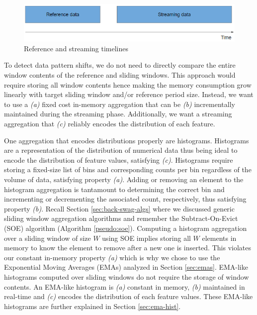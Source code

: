\begin{figure}[!htb]
    \begin{center}
      \includegraphics[scale=0.7]{figures/timeperiods.png}
      \caption[]{Reference and streaming timelines}
      \label{fig:timelines}
    \end{center}
\end{figure}

To detect data pattern shifts, we do not need to directly compare the entire window contents of the reference and sliding windows. This approach would require storing all window contents hence making the memory consumption grow linearly with target sliding window and/or reference period size. Instead, we want to use a \textit{(a)} fixed cost in-memory aggregation that can be \textit{(b)} incrementally maintained during the streaming phase. Additionally, we want a streaming aggregation that \textit{(c)} reliably encodes the distribution of each feature. 

One aggregation that encodes distributions properly are histograms. Histograms are a representation of the distribution of numerical data thus being ideal to encode the distribution of feature values, satisfying \textit{(c)}. Histograms require storing a fixed-size list of bins and corresponding counts per bin regardless of the volume of data, satisfying property \textit{(a)}. Adding or removing an element to the histogram aggregation is tantamount to determining the correct bin and incrementing or decrementing the associated count, respectively, thus satisfying property \textit{(b)}. Recall Section \ref{sec:back-swag-algs} where we discussed generic sliding window aggregation algorithms and remember the Subtract-On-Evict (SOE) algorithm (Algorithm \ref{pseudo:soe}). Computing a histogram aggregation over a sliding window of size $W$ using SOE implies storing all $W$ elements in memory to know the element to remove after a new one is inserted. This violates our constant in-memory property \textit{(a)} which is why we chose to use the Exponential Moving Averages (EMAs) analyzed in Section \ref{sec:emas}. EMA-like histograms computed over sliding windows do not require the storage of window contents. An EMA-like histogram is \textit{(a)} constant in memory, \textit{(b)} maintained in real-time and \textit{(c)} encodes the distribution of each feature values. These EMA-like histograms are further explained in Section \ref{sec:ema-hist}.

